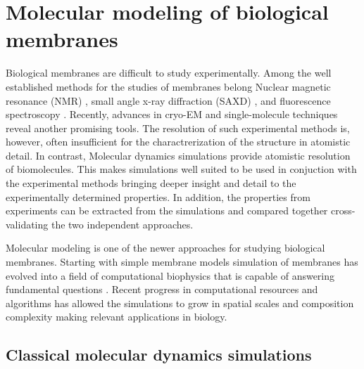 \chapter{Molecular modeling of biological membranes}
\label{chap:methods}

Biological membranes are difficult to study experimentally. 
Among the well established methods for the studies of membranes belong
Nuclear magnetic resonance (NMR)     \citep{catte16, botan15, seelig80, seelig90, seelig87}, 
small angle x-ray diffraction (SAXD) \citep{ollila16, pabst07}, 
and fluorescence spectroscopy        \citep{javanainen17, melcrova16}. 
Recently, advances in cryo-EM        \citep{chiu2017editorial, nogales2015development}
and single-molecule techniques       \citep{ritchie2013single}
reveal another promising tools. 
The resolution of such experimental methods is, however, often insufficient 
for the charactrerization of the structure in atomistic detail. 
In contrast, Molecular dynamics simulations provide atomistic resolution of biomolecules.
This makes simulations well suited to be used in conjuction with the experimental methods
bringing deeper insight and detail to the experimentally determined properties. 
In addition, the properties from experiments can be extracted from the simulations 
and compared together cross-validating the two independent approaches. 

Molecular modeling is one of the newer approaches for studying biological membranes. 
Starting with simple membrane models \citep{Berger97, bockmann04, bockmann03, sachs04, sachs04_potential} 
simulation of membranes has evolved into a field of computational biophysics
that is capable of answering fundamental questions \citep{Bilkova2017Calcium, magarkar2017}.
Recent progress in computational resources and algorithms
has allowed the simulations to grow in spatial scales and composition complexity 
making relevant applications in biology. \citep{perspective_cecam_lugano_2018, eerden17} 


\section{Classical molecular dynamics simulations}
\label{section:md}

